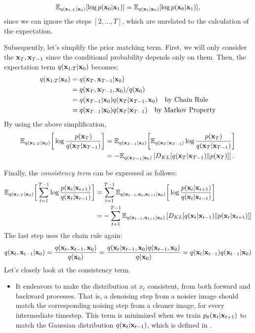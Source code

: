 \begin{align*}
	\mathbb{E}_{q({\mathbf{x}}_{1:T}|{\mathbf{x}}_0)}[\log p({\mathbf{x}}_0|{\mathbf{x}}_{1})] = \mathbb{E}_{q({\mathbf{x}}_{1}|{\mathbf{x}}_0)}[\log p({\mathbf{x}}_0|{\mathbf{x}}_{1})], 
\end{align*}
since we can ignore the steps $[2,\dots,T]$, which are unrelated to the calculation of the expectation. 

Subsequently, let's simplify the prior matching term. First, we will only consider the ${\mathbf{x}}_T, {\mathbf{x}}_{T-1}$ since the conditional probability depends only on them. Then, the expectation term $q({\mathbf{x}}_{1:T}|{\mathbf{x}}_0)$ becomes:
\begin{align*}
	q({\mathbf{x}}_{1:T}|{\mathbf{x}}_0) &= q({\mathbf{x}}_{T},{\mathbf{x}}_{T-1}|{\mathbf{x}}_0)\\
						 &= q({\mathbf{x}}_{T},{\mathbf{x}}_{T-1},{\mathbf{x}}_0)/q({\mathbf{x}}_0)\\
						 &= q({\mathbf{x}}_{T-1}|{\mathbf{x}}_0)q({\mathbf{x}}_T|{\mathbf{x}}_{T-1},{\mathbf{x}}_0) \quad \text{by Chain Rule}\\
						 &= q({\mathbf{x}}_{T-1}|{\mathbf{x}}_0)q({\mathbf{x}}_T|{\mathbf{x}}_{T-1}) \quad \text{by Markov Property}
\end{align*}
By using the above simplification,
\begin{align*}
	\mathbb{E}_{q({\mathbf{x}}_{1:T}|{\mathbf{x}}_0)}\bigg[\log \frac{p({\mathbf{x}}_T)}{q({\mathbf{x}}_T|{\mathbf{x}}_{T-1})}\bigg] &= \mathbb{E}_{q({\mathbf{x}}_{T-1}|{\mathbf{x}}_0)}\bigg[\mathbb{E}_{q({\mathbf{x}}_{T}|{\mathbf{x}}_{T-1})} \log \frac{p({\mathbf{x}}_T)}{q({\mathbf{x}}_T|{\mathbf{x}}_{T-1})}\bigg]\\ 
																							 &= -\mathbb{E}_{q({\mathbf{x}}_{T-1}|{\mathbf{x}}_0)}\left[D_{KL}[ q({\mathbf{x}}_{T}|{\mathbf{x}}_{T-1}) \| p({\mathbf{x}}_T) ]\right].
\end{align*}

Finally, the \textit{consistency term} can be expressed as follows:
\begin{align*}
	\mathbb{E}_{q({\mathbf{x}}_{1:T}|{\mathbf{x}}_0)}\bigg[\sum_{t=1}^{T-1}\log \frac{ p({\mathbf{x}}_{t}|{\mathbf{x}}_{t+1})}{q({\mathbf{x}}_{t}|{\mathbf{x}}_{t-1})}\bigg] &= \sum_{t=1}^{T-1}\mathbb{E}_{q({\mathbf{x}}_{t-1},{\mathbf{x}}_t,{\mathbf{x}}_{t+1}|{\mathbf{x}}_0)}\bigg[\log \frac{ p({\mathbf{x}}_{t}|{\mathbf{x}}_{t+1})}{q({\mathbf{x}}_{t}|{\mathbf{x}}_{t-1})}\bigg]\\
																															 &= - \sum_{t=1}^{T-1} \mathbb{E}_{q({\mathbf{x}}_{t-1},{\mathbf{x}}_{t+1}|{\mathbf{x}}_0)}\left[D_{KL}[q({\mathbf{x}}_{t}|{\mathbf{x}}_{t-1})\|p({\mathbf{x}}_{t}|{\mathbf{x}}_{t+1})]\right]
\end{align*}
The last step uses the chain rule again:
\begin{align*}
	q({\mathbf{x}}_{t}, {\mathbf{x}}_{t-1}|{\mathbf{x}}_0) = \frac{q({\mathbf{x}}_{t}, {\mathbf{x}}_{t-1},{\mathbf{x}}_0)}{q({\mathbf{x}}_0)} = \frac{q({\mathbf{x}}_{t}|{\mathbf{x}}_{t-1}, {\mathbf{x}}_0)q({\mathbf{x}}_{t-1}, {\mathbf{x}}_0)}{q({\mathbf{x}}_0)} = q({\mathbf{x}}_{t}|{\mathbf{x}}_{t-1})q({\mathbf{x}}_{t-1}|{\mathbf{x}}_0)
\end{align*}
Let's closely look at the consistency term. 
\begin{itemize}
	\item It endeavors to make the distribution at $x_t$ consistent, from both forward and backward processes. That is, a denoising step from a noisier image should match the corresponding noising step from a cleaner image, for every intermediate timestep.  This term is minimized when we train $p_\theta({\mathbf{x}}_t|{\mathbf{x}}_{t+1})$ to match the Gaussian distribution $q({\mathbf{x}}_t|{\mathbf{x}}_{t-1})$, which is defined in . 
\end{itemize}

